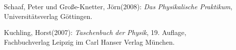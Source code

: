   \newpage
  \begin{thebibliography}{9}


     Schaaf, Peter und Große-Knetter, Jörn(2008): \emph{Das Physikalische Praktikum},\\
                       Universitätsverlag Göttingen.

     Kuchling, Horst(2007): \emph{Taschenbuch der Physik},
                       19. Auflage,\\ Fachbuchverlag Leipzig im Carl Hanser Verlag München.


  \end{thebibliography}

 


